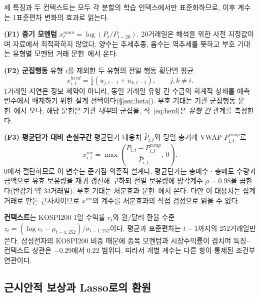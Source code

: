 세 특징과 두 컨텍스트는 모두 각 분할의 학습 인덱스에서만 표준화하므로, 이후 계수는
1표준편차 변화의 효과로 읽는다.

\textbf{(F1) 중기 모멘텀} $x^{mom}_{t}=\log(P_t/P_{t-20})$. 20거래일은 해석을 위한
사전 지정값이며 자료에서 최적화하지 않았다. 양수는 추세추종, 음수는 역추세를 뜻하고
부호 기대는 유형별 모멘텀 거래 문헌~\cite{grinblatt2000investment,choe1999foreign}에서
온다.

\textbf{(F2) 군집행동} 유형 $i$를 제외한 두 유형의 전일 행동 횡단면 평균
\begin{equation}
x^{herd}_{i,t}=\tfrac{1}{2}\left(u_{j,t-1}+u_{k,t-1}\right),\qquad j,k\neq i.
\label{eq:herd}
\end{equation}
1거래일 지연은 정보 제약이 아니라, 동일 거래일 유형 간 수급의 회계적 상쇄를 예측
변수에서 배제하기 위한 설계 선택이다(\S\ref{sec:beta}). 부호 기대는 기관 군집행동
문헌~\cite{lakonishok1992impact}에서 오나, 해당 문헌은 기관 \emph{내부}의 군집을,
식~\eqref{eq:herd}은 \emph{유형 간} 관계를 측정한다.

\textbf{(F3) 평균단가 대비 손실구간} 평균단가 대용치 $\bar P_{i,t}$와 당일 총거래
VWAP $P^{vwap}_{i,t}$로
\begin{equation}
x^{uw}_{i,t}=\max\!\left(
\frac{\bar P_{i,t}-P^{vwap}_{i,t}}{\bar P_{i,t}},\,0\right).
\label{eq:underwater}
\end{equation}
0에서 절단하므로 이 변수는 준거점 의존적 설계다. 평균단가는 총매수ㆍ총매도 수량과
금액으로 유효 보유량을 재귀 갱신해 구하되 전일 보유량에 망각계수 $\rho=0.98$을
곱한다(반감기 약 34거래일). 부호 기대는 처분효과
문헌~\cite{shefrin1985disposition,odean1998investors}에서 온다. 다만 이 대용치는
집계 거래로 만든 근사치이므로 $x^{uw}$의 계수를 처분효과의 직접 검정으로 읽을 수
없다.

\textbf{컨텍스트}는 KOSPI200 1일 수익률 $r_t$와 원/달러 환율 수준
$z_t=(\log e_t-\mu_{t-1,252})/\sigma_{t-1,252}$이다. 평균과 표준편차는 $t-1$까지의
252거래일만 쓴다. 삼성전자의 KOSPI200 비중 때문에 종목 모멘텀과 시장수익률이
겹치며 특징--컨텍스트 상관은 $-0.29$에서 $0.22$ 범위다. 따라서 개별 계수는 다른
항이 통제된 조건부 연관이다.

\subsection{근시안적 보상과 Lasso로의 환원}
\label{sec:model}

